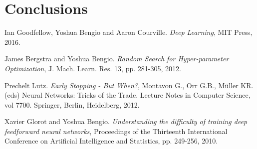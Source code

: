 \documentclass[11pt,twoside]{article}
\begin{document}


\clearpage

\section{Conclusions} %
\label{sec:conclusions}



\begin{thebibliography}{99} %
    Ian Goodfellow, Yoshua Bengio and Aaron Courville.
    \textit{Deep Learning}, MIT Press, 2016.

    James Bergstra and Yoshua Bengio.
    \textit{Random Search for Hyper-parameter Optimization}, J. Mach. Learn. Res. 13, pp. 281-305, 2012.

    Prechelt Lutz.
    \textit{Early Stopping - But When?}, Montavon G., Orr G.B., Müller KR. (eds) Neural Networks: Tricks of the
    Trade. Lecture Notes in Computer Science, vol 7700. Springer, Berlin, Heidelberg, 2012.

    Xavier Glorot and Yoshua Bengio.
    \textit{Understanding the difficulty of training deep feedforward neural networks},
    Proceedings of the Thirteenth International Conference on Artificial Intelligence and Statistics, pp.
    249-256, 2010.
\end{thebibliography}

\newpage


\end{document}
